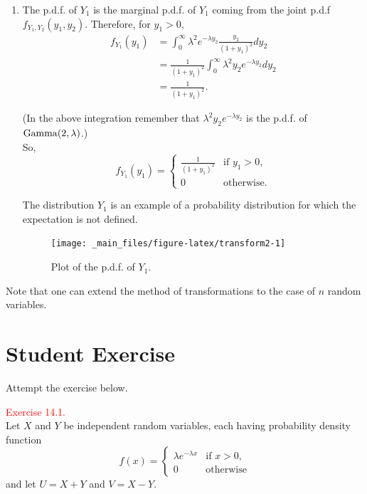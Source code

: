 \documentclass[
]{book}
\providecommand{\tightlist}{%
  \setlength{\itemsep}{0pt}\setlength{\parskip}{0pt}}
\begin{document}
\begin{enumerate}
\def\labelenumi{(\alph{enumi})}
\setcounter{enumi}{1}
\tightlist
\item
  The p.d.f. of \(Y_1\) is the marginal p.d.f. of \(Y_1\) coming from the joint p.d.f \(f_{Y_1,Y_2}(y_1,y_2)\). Therefore, for \(y_1 >0\),\\

  \begin{align*}
  f_{Y_1}(y_1) &= \int_0^{\infty} \lambda^2 e^{-\lambda y_2} \frac{y_2}{(1+y_1)^2} dy_2 \\
  &= \frac{1}{(1+y_1)^2} \int_0^{\infty} \lambda^2 y_2 e^{-\lambda y_2} dy_2 \\
  &= \frac{1}{(1+y_1)^2}.
  \end{align*}

  (In the above integration remember that \(\lambda^2 y_2 e^{-\lambda y_2}\) is the p.d.f. of \({\rm Gamma} (2,\lambda)\).)\\
  So,\\

  \[ f_{Y_1}(y_1) = \begin{cases} \frac{1}{(1+y_1)^2} & \text{if } y_1>0, \\[3pt] 0 & \text{otherwise.} \end{cases} \]

  The distribution \(Y_1\) is an example of a probability distribution for which the expectation is not defined.\\

  \begin{figure}
  \texttt{[image: \_main\_files/figure-latex/transform2-1]} \caption{Plot of the p.d.f. of $Y_1$.}\label{fig:transform2}
  \end{figure}
\end{enumerate}

\hfill\break

Note that one can extend the method of transformations to the case of \(n\) random variables.\\

\hypertarget{Transform:exer}{%
\section*{\texorpdfstring{{\textbf{Student Exercise}}}{Student Exercise}}\label{Transform:exer}}

Attempt the exercise below.

\leavevmode{}%
\textcolor{red}{Exercise 14.1.}\\
Let \(X\) and \(Y\) be independent random variables, each having probability density function
\[ f(x) = \begin{cases} \lambda e^{-\lambda x} & \text{if } x>0, \\ 0 & \text{otherwise} \end{cases} \]
and let \(U=X+Y\) and \(V=X-Y\).
\end{document}
